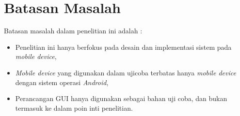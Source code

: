 \section{Batasan Masalah}
Batasan masalah dalam penelitian ini adalah :
\begin{itemize}
\item Penelitian ini hanya berfokus pada desain dan implementasi sistem pada \textit{mobile device},
\item \textit{Mobile device} yang digunakan dalam ujicoba terbatas hanya \textit{mobile device} dengan sistem operasi \textit{Android},
\item Perancangan GUI hanya digunakan sebagai bahan uji coba, dan bukan termasuk ke dalam poin inti penelitian.
\end{itemize}


